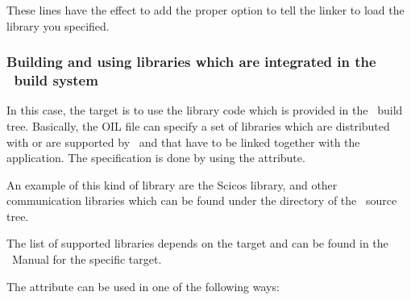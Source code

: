 These lines have the effect to add the proper option to tell the
linker to load the library you specified.

\subsubsection{Building and using libraries which are integrated in the \ee\ build system}

In this case, the target is to use the library code which is provided
in the \ee\ build tree. Basically, the OIL file can specify a set of
libraries which are distributed with or are supported by \ee\ and that
have to be linked together with the application. The specification is
done by using the  attribute.

An example of this kind of library are the Scicos library, and other
communication libraries which can be found under the 
directory of the \ee\ source tree.

The list of supported libraries depends on the target and
can be found in the \ee\ Manual for the specific target. 

The  attribute can be used in one of the following ways:

